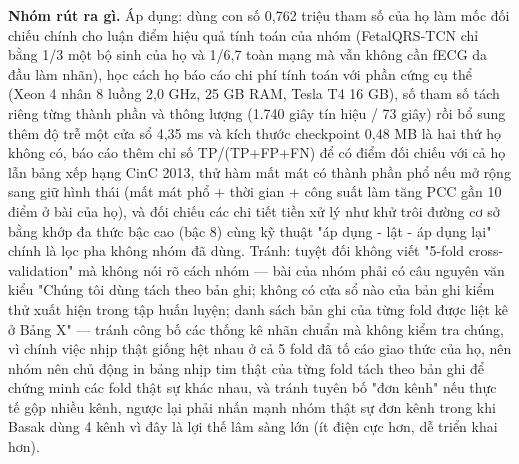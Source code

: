 \documentclass[12pt,a4paper]{article}
\begin{document}
\noindent \textbf{\color{tdtblue}Nhóm rút ra gì.} Áp dụng: dùng con số 0,762 triệu tham số của họ làm mốc đối chiếu chính cho luận điểm hiệu quả tính toán của nhóm (FetalQRS-TCN chỉ bằng 1/3 một bộ sinh của họ và 1/6,7 toàn mạng mà vẫn không cần fECG da đầu làm nhãn), học cách họ báo cáo chi phí tính toán với phần cứng cụ thể (Xeon 4 nhân 8 luồng 2,0 GHz, 25 GB RAM, Tesla T4 16 GB), số tham số tách riêng từng thành phần và thông lượng (1.740 giây tín hiệu / 73 giây) rồi bổ sung thêm độ trễ một cửa sổ 4,35 ms và kích thước checkpoint 0,48 MB là hai thứ họ không có, báo cáo thêm chỉ số TP/(TP+FP+FN) để có điểm đối chiếu với cả họ lẫn bảng xếp hạng CinC 2013, thử hàm mất mát có thành phần phổ nếu mở rộng sang giữ hình thái (mất mát phổ + thời gian + công suất làm tăng PCC gần 10 điểm ở bài của họ), và đối chiếu các chi tiết tiền xử lý như khử trôi đường cơ sở bằng khớp đa thức bậc cao (bậc 8) cùng kỹ thuật "áp dụng - lật - áp dụng lại" chính là lọc pha không nhóm đã dùng. Tránh: tuyệt đối không viết "5-fold cross-validation" mà không nói rõ cách nhóm — bài của nhóm phải có câu nguyên văn kiểu "Chúng tôi dùng tách theo bản ghi; không có cửa sổ nào của bản ghi kiểm thử xuất hiện trong tập huấn luyện; danh sách bản ghi của từng fold được liệt kê ở Bảng X" — tránh công bố các thống kê nhãn chuẩn mà không kiểm tra chúng, vì chính việc nhịp thật giống hệt nhau ở cả 5 fold đã tố cáo giao thức của họ, nên nhóm nên chủ động in bảng nhịp tim thật của từng fold tách theo bản ghi để chứng minh các fold thật sự khác nhau, và tránh tuyên bố "đơn kênh" nếu thực tế gộp nhiều kênh, ngược lại phải nhấn mạnh nhóm thật sự đơn kênh trong khi Basak dùng 4 kênh vì đây là lợi thế lâm sàng lớn (ít điện cực hơn, dễ triển khai hơn).\par\vspace{3pt}
\vspace{6pt}
\end{document}
